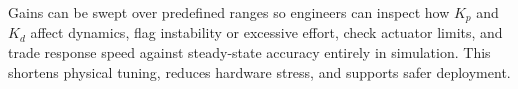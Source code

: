 \documentclass[a4paper, 10pt, conference]{ieeeconf}      %
\begin{document}
Gains can be swept over predefined ranges so engineers can inspect how \(K_p\) and \(K_d\) affect dynamics, flag instability or excessive effort, check actuator limits, and trade response speed against steady-state accuracy entirely in simulation. This shortens physical tuning, reduces hardware stress, and supports safer deployment.




\end{document}
